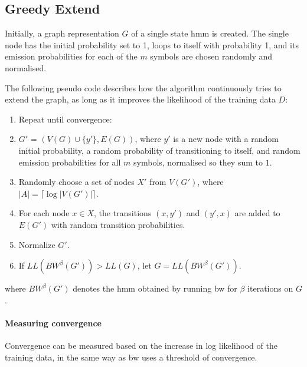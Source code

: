 \subsection{Greedy Extend}
\label{sec:greedy_extend}
Initially, a graph representation $G$ of a single state \gls{hmm} is created. The single node has the initial probability set to 1, loops to itself with probability 1, and its emission probabilities for each of the $m$ symbols are chosen randomly and normalised.

The following pseudo code describes how the algorithm continuously tries to extend the graph, as long as it improves the likelihood of the training data $D$:
\begin{enumerate}
\item Repeat until convergence:
	\item $G'$ = $(V(G) \cup \{y'\}, E(G))$, where $y'$ is a new node with a random initial probability, a random probability of transitioning to itself, and random emission probabilities for all $m$ symbols, normalised so they sum to $1$.
	\item Randomly choose a set of nodes $X'$ from $V(G')$, where $|A| = \lceil \log |V(G')| \rceil$.
	\item For each node $x \in X$, the transitions $(x, y')$ and $(y', x)$ are added to $E(G')$ with random transition probabilities.
	\item Normalize $G'$.
	\item If $LL(BW^{\beta}(G')) > LL(G)$, let $G = LL(BW^{\beta}(G'))$.
\end{enumerate}
where $BW^{\beta}(G')$ denotes the \gls{hmm} obtained by running \gls{bw} for $\beta$ iterations on $G$.

\paragraph{Measuring convergence}
Convergence can be measured based on the increase in log likelihood of the training data, in the same way as \gls{bw} uses a threshold of convergence.


